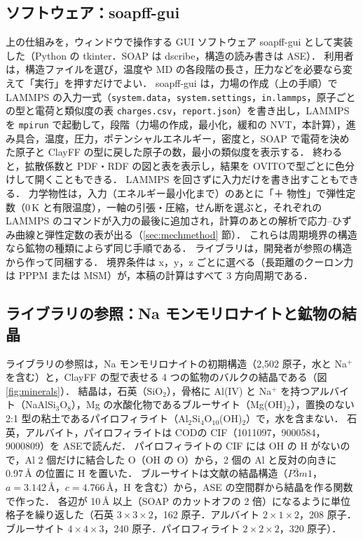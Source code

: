 \documentclass[a4paper,11pt]{article}
\begin{document}
\subsection{ソフトウェア：soapff-gui}
上の仕組みを，ウィンドウで操作する GUI ソフトウェア soapff-gui として実装した（Python の tkinter．SOAP は dscribe\cite{dscribe}，構造の読み書きは ASE\cite{ase}）．
利用者は，構造ファイルを選び，温度や MD の各段階の長さ，圧力などを必要なら変えて「実行」を押すだけでよい．
soapff-gui は，力場の作成（上の手順）で LAMMPS の入力一式（\texttt{system.data}，\texttt{system.settings}，\texttt{in.lammps}，原子ごとの型と電荷と類似度の表 \texttt{charges.csv}，\texttt{report.json}）を書き出し，LAMMPS を \texttt{mpirun} で起動して，段階（力場の作成，最小化，緩和の NVT，本計算），進み具合，温度，圧力，ポテンシャルエネルギー，密度と，SOAP で電荷を決めた原子と ClayFF の型に戻した原子の数，最小の類似度を表示する．
終わると，拡散係数と PDF・RDF の図と表を表示し，結果を OVITO\cite{ovito}で型ごとに色分けして開くこともできる．
LAMMPS を回さずに入力だけを書き出すこともできる．
力学物性は，入力（エネルギー最小化まで）のあとに「＋ 物性」で弾性定数（0\,K と有限温度），一軸の引張・圧縮，せん断を選ぶと，それぞれの LAMMPS のコマンドが入力の最後に追加され，計算のあとの解析で応力--ひずみ曲線と弾性定数の表が出る（\ref{sec:mechmethod} 節）．
これらは周期境界の構造なら鉱物の種類によらず同じ手順である．
ライブラリは，開発者が参照の構造から作って同梱する．
境界条件は x，y，z ごとに選べる（長距離のクーロン力は PPPM または MSM）が，本稿の計算はすべて 3 方向周期である．

\subsection{ライブラリの参照：Na モンモリロナイトと鉱物の結晶}
\label{sec:refs}
ライブラリの参照は，Na モンモリロナイトの初期構造（2{,}502 原子，水と Na$^+$ を含む）と，ClayFF の型で表せる 4 つの鉱物のバルクの結晶である（図\ref{fig:minerals}）．
結晶は，石英（SiO$_2$），骨格に Al(IV) と Na$^+$ を持つアルバイト（NaAlSi$_3$O$_8$），Mg の水酸化物であるブルーサイト（Mg(OH)$_2$），置換のない 2:1 型の粘土であるパイロフィライト（Al$_2$Si$_4$O$_{10}$(OH)$_2$）で，水を含まない．
石英，アルバイト，パイロフィライトは COD\cite{cod}の CIF（1011097，9000584，9000809）を ASE\cite{ase}で読んだ．
パイロフィライトの CIF には OH の H がないので，Al 2 個だけに結合した O（OH の O）から，2 個の Al と反対の向きに 0.97\,\AA{} の位置に H を置いた．
ブルーサイトは文献の結晶構造（$P\bar{3}m1$，$a=3.142$\,\AA，$c=4.766$\,\AA，H を含む）\cite{catti1995}から，ASE の空間群から結晶を作る関数で作った．
各辺が 10\,\AA{} 以上（SOAP のカットオフの 2 倍）になるように単位格子を繰り返した（石英 $3\times3\times2$，162 原子．アルバイト $2\times1\times2$，208 原子．ブルーサイト $4\times4\times3$，240 原子．パイロフィライト $2\times2\times2$，320 原子）．
\end{document}

